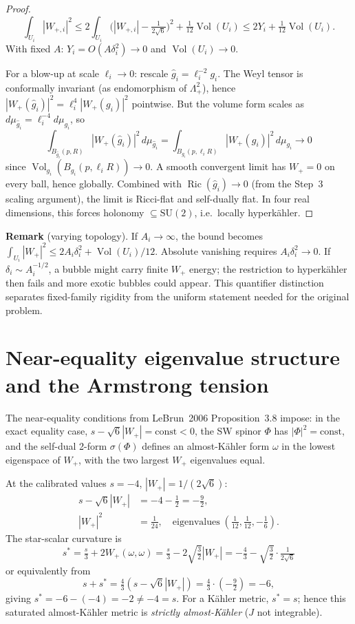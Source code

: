 \begin{proof}
\[
  \int_{U_i}|W_{+,i}|^2
  \le 2\int_{U_i}\bigl(|W_{+,i}|-\tfrac{1}{2\sqrt6}\bigr)^2
  +\tfrac{1}{12}\operatorname{Vol}(U_i)
  \le 2Y_i+\tfrac{1}{12}\operatorname{Vol}(U_i).
\]
With fixed \(A\): \(Y_i=O(A\delta_i^2)\to0\) and
\(\operatorname{Vol}(U_i)\to0\).

For a blow-up at scale \(\ell_i\to0\): rescale \(\hat g_i=\ell_i^{-2}g_i\).
The Weyl tensor is conformally invariant (as endomorphism of \(\Lambda^2_+\)),
hence \(|W_+(\hat g_i)|^2=\ell_i^4|W_+(g_i)|^2\) pointwise.
But the volume form scales as \(d\mu_{\hat g_i}=\ell_i^{-4}d\mu_{g_i}\),
so
\[
  \int_{B_{\hat g_i}(p,R)}|W_+(\hat g_i)|^2\,d\mu_{\hat g_i}
  =\int_{B_{g_i}(p,\ell_iR)}|W_+(g_i)|^2\,d\mu_{g_i}\to0
\]
since \(\operatorname{Vol}_{g_i}(B_{g_i}(p,\ell_iR))\to0\).  A smooth
convergent limit has \(W_+=0\) on every ball, hence globally.  Combined with
\(\operatorname{Ric}(\hat g_i)\to0\) (from the Step~3 scaling argument), the
limit is Ricci-flat and self-dually flat.  In four real dimensions, this forces
holonomy \(\subseteq\mathrm{SU}(2)\), i.e.\ locally hyperk\"ahler.
\end{proof}

\noindent\textbf{Remark} (varying topology).
If \(A_i\to\infty\), the bound becomes
\(\int_{U_i}|W_+|^2\le2A_i\delta_i^2+\operatorname{Vol}(U_i)/12\).
Absolute vanishing requires \(A_i\delta_i^2\to0\).  If
\(\delta_i\sim A_i^{-1/2}\), a bubble might carry finite \(W_+\) energy;
the restriction to hyperk\"ahler then fails and more exotic bubbles could
appear.  This quantifier distinction separates fixed-family rigidity from the
uniform statement needed for the original problem.

\section{Near-equality eigenvalue structure and the Armstrong tension}

The near-equality conditions from LeBrun~2006 Proposition~3.8 impose:
in the exact equality case, \(s-\sqrt6|W_+|=\text{const}<0\), the SW spinor
\(\Phi\) has \(|\Phi|^2=\text{const}\), and the self-dual 2-form
\(\sigma(\Phi)\) defines an almost-K\"ahler form \(\omega\) in the lowest
eigenspace of \(W_+\), with the two largest \(W_+\) eigenvalues equal.

At the calibrated values \(s=-4\), \(|W_+|=1/(2\sqrt6)\):
\begin{align}
  s-\sqrt6|W_+|&=-4-\tfrac12=-\tfrac92, \tag{E1}\\
  |W_+|^2&=\tfrac{1}{24},\quad
  \text{eigenvalues}\; (\tfrac{1}{12},\tfrac{1}{12},-\tfrac{1}{6}). \tag{E2}
\end{align}
The star-scalar curvature is
\[
  s^*=\tfrac{s}{3}+2W_+(\omega,\omega)
  =\tfrac{s}{3}-2\sqrt{\tfrac{3}{2}}|W_+|
  =-\tfrac43-\sqrt{\tfrac{3}{2}}\cdot\tfrac{1}{2\sqrt6}
\]
or equivalently from
\[
  s+s^*=\tfrac{4}{3}(s-\sqrt6|W_+|)=\tfrac43\cdot(-\tfrac92)=-6,
\]
giving \(s^*=-6-(-4)=-2\ne-4=s\).
For a K\"ahler metric, \(s^*=s\); hence this saturated almost-K\"ahler metric
is \emph{strictly almost-K\"ahler} (\(J\) not integrable).

